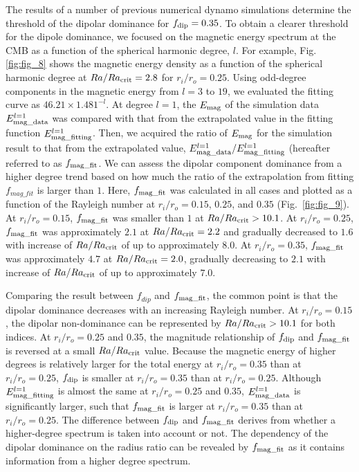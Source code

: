 The results of a number of previous numerical dynamo simulations determine the threshold of the dipolar dominance for $f_{\rm dip} = 0.35$. 
To obtain a clearer threshold for the dipole dominance, we focused on the magnetic energy spectrum at the CMB as a function of the spherical harmonic degree, $l$. 
For example, Fig. \ref{fig:fig_8} shows the magnetic energy density as a function of the spherical harmonic degree at $Ra/Ra_{\rm crit} = 2.8$ for $r_i/r_o = 0.25$. 
Using odd-degree components in the magnetic energy from $l = 3$ to $19$, we evaluated the fitting curve as $46.21 \times 1.481^{-l}$. 
At degree $l = 1$, the $E_{\rm mag}$ of the simulation data $E_{\rm mag\_data}^{l = 1}$ was compared with that from the extrapolated value in the fitting function $E_{\rm mag\_fitting}^{l = 1}$. 
Then, we acquired the ratio of $E_{\rm mag}$ for the simulation result to that from the extrapolated value, $E_{\rm mag\_data}^{l = 1}/E_{\rm mag\_fitting}^{l=1}$ (hereafter referred to as $f_{\rm mag\_fit}$. 
We can assess the dipolar component dominance from a higher degree trend based on how much the ratio of the extrapolation from fitting $f_{mag\_fit}$ is larger than $1$. 
Here, $f_{\rm mag\_fit}$ was calculated in all cases and plotted as a function of the Rayleigh number at $r_i/r_o = 0.15$, $0.25$, and $0.35$ (Fig.~\ref{fig:fig_9}). 
At $r_i/r_o = 0.15$, $f_{\rm mag\_fit}$ was smaller than $1$ at $Ra/Ra_{\rm crit} > 10.1$. 
At $r_i/r_o = 0.25$, $f_{\rm mag\_fit}$ was approximately $2.1$ at $Ra/Ra_{\rm crit} = 2.2$ and gradually decreased to $1.6$ with increase of $Ra/Ra_{\rm crit}$ of up to approximately $8.0$. 
At $r_i/r_o = 0.35$, $f_{\rm mag\_fit}$ was approximately $4.7$ at $Ra/Ra_{\rm crit} = 2.0$, gradually decreasing to $2.1$ with increase of $Ra/Ra_{\rm crit}$ of up to approximately $7.0$.

Comparing the result between $f_{dip}$ and $f_{\rm mag\_fit}$, the common point is that the dipolar dominance decreases with an increasing Rayleigh number. 
At $r_i/r_o = 0.15$, the dipolar non-dominance can be represented by $Ra/Ra_{\rm crit} > 10.1$ for both indices. 
At $r_i/r_o = 0.25$ and $0.35$, the magnitude relationship of $f_{\rm dip}$ and $f_{\rm mag\_fit}$ is reversed at a small $Ra/Ra_{\rm crit}$ value. 
Because the magnetic energy of higher degrees is relatively larger for the total energy at $r_i/r_o = 0.35$ than at $r_i/r_o = 0.25$, $f_{\rm dip}$ is smaller at $r_i/r_o = 0.35$ than at $r_i/r_o = 0.25$. 
Although $E_{\rm mag\_fitting}^{l = 1}$ is almost the same at $r_i/r_o = 0.25$ and $0.35$, $E_{\rm mag\_data}^{l = 1}$ is significantly larger, such that $f_{\rm mag\_fit}$ is larger at $r_i/r_o = 0.35$ than at $r_i/r_o = 0.25$. 
The difference between $f_{\rm dip}$ and $f_{\rm mag\_fit}$ derives from whether a higher-degree spectrum is taken into account or not. 
The dependency of the dipolar dominance on the radius ratio can be revealed by $f_{\rm mag\_fit}$ as it contains information from a higher degree spectrum.

